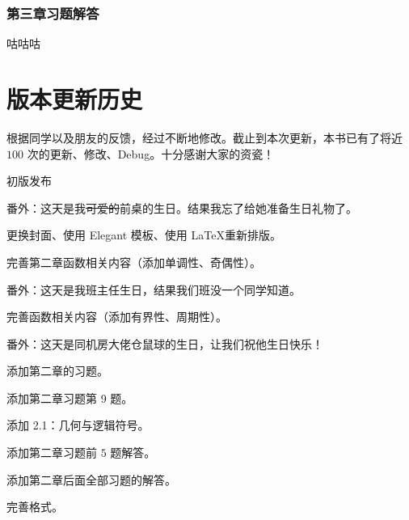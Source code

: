 \documentclass[lang=cn,10pt]{template}
\begin{document}
\subsection{第三章习题解答}
咕咕咕

\chapter{版本更新历史}

根据同学以及朋友的反馈，经过不断地修改。截止到本次更新，本书已有了将近 $100$ 次的更新、修改、Debug。十分感谢大家的资瓷！

\begin{change}
  \item 初版发布
\end{change}
番外：这天是我\sout{可爱的}前桌的生日。结果我忘了给她准备生日礼物了。

\begin{change}
  \item 更换封面、使用 Elegant 模板、使用 \LaTeX 重新排版。
  \item 完善第二章函数相关内容（添加单调性、奇偶性）。
\end{change}
番外：这天是我班主任生日，结果我们班没一个同学知道。

\begin{change}
  \item 完善函数相关内容（添加有界性、周期性）。
\end{change}
番外：这天是同机房大佬仓鼠球的生日，让我们祝他生日快乐！

\begin{change}
  \item 添加第二章的习题。
\end{change}

\begin{change}
  \item 添加第二章习题第 9 题。
  \item 添加 2.1：几何与逻辑符号。
\end{change}

\begin{change}
  \item 添加第二章习题前 $5$ 题解答。
\end{change}

\begin{change}
  \item 添加第二章后面全部习题的解答。
  \item 完善格式。
\end{change}
\end{document}
